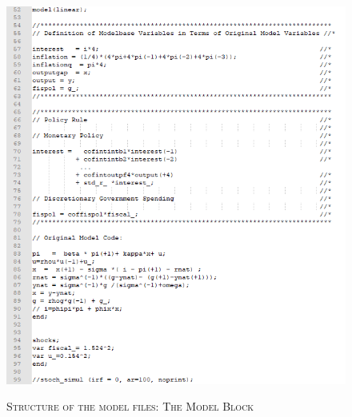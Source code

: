\begin{figure}[p]
\centering
\caption{\textsc{Structure of the model files: The Model Block}}
\vspace{0.2cm}
\includegraphics[width=15cm,keepaspectratio]{mod2.png}\\
\label{img:modStructureRW97b}
\end{figure}

\vspace{2cm}


